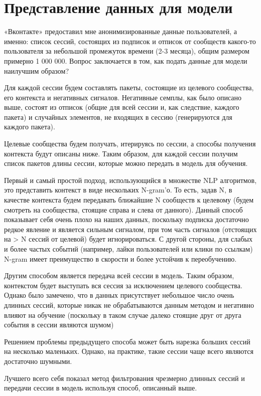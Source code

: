 \documentclass[times,specification,annotation]{itmo-student-thesis}
\begin{document}
\section{Представление данных для модели}
«Вконтакте» предоставил мне анонимизированные данные пользователей, а
именно: список сессий, состоящих из подписок и отписок от сообществ какого-то
пользователя за небольшой промежуток времени (2-3 месяца), общим размером
примерно 1 000 000. Вопрос заключается в том, как подать данные для модели
наилучшим образом?

Для каждой сессии будем составлять пакеты, состоящие из целевого
сообщества, его контекста и негативных сигналов. Негативные семплы, как было
описано выше, состоят из отписок (общие для всей сессии и, как следствие,
каждого пакета) и случайных элементов, не входящих в сессию (генерируются для
каждого пакета).

Целевые сообщества будем получать, итерируясь по сессии, а способы
получения контекста будут описаны ниже. Таким образом, для каждой сессии
получим список пакетов длины сессии, которые можно передать в модель для
обучения.

Первый и самый простой подход, использующийся в множестве NLP
алгоритмов, это представить контекст в виде нескольких N-gram’о. То есть, задав
N, в качестве контекста будем передавать ближайшие N сообществ к целевому
(будем смотреть на сообщества, стоящие справа и слева от данного). Данный
способ показывает себя очень плохо на наших данных, поскольку подписка
достаточно редкое явление и является сильным сигналом, при том часть сигналов
(отстоящих на > N сессий от целевой) будет игнорироваться. С другой стороны,
для слабых и более частых событий (например, лайки пользователей или клики по
ссылкам) N-gram имеет преимущество в скорости и более устойчив к
переобучению.

Другим способом является передача всей сессии в модель. Таким образом,
контекстом будет выступать вся сессия за исключением целевого сообщества.
Однако было замечено, что в данных присутствует небольшое число очень
длинных сессий, которые никак не обрабатываются данным методом и негативно
влияют на обучение (поскольку в таком случае далеко стоящие друг от друга
события в сессии являются шумом)

Решением проблемы предыдущего способа может быть нарезка больших
сессий на несколько маленьких. Однако, на практике, такие сессии чаще всего
являются достаточно шумными.

Лучшего всего себя показал метод фильтрования чрезмерно длинных сессий
и передачи сессии в модель используя способ, описанный выше.
\end{document}
